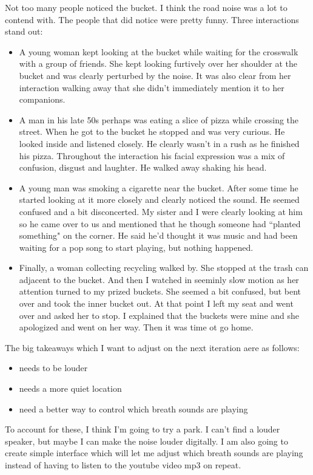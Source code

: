 \documentclass[11pt]{report}
\begin{document}
Not too many people noticed the bucket. I think the road noise was a lot to contend with. The people that did notice were pretty funny. Three interactions stand out:
\begin{itemize}
\item
A young woman kept looking at the bucket while waiting for the crosswalk with a group of friends. She kept looking furtively over her shoulder at the bucket and was clearly perturbed by the noise. It was also clear from her interaction walking away that she didn't immediately mention it to her companions. 
\item
A man in his late 50s perhaps was eating a slice of pizza while crossing the street. When he got to the bucket he stopped and was very curious. He looked inside and listened closely. He clearly wasn't in a rush as he finished his pizza. Throughout the interaction his facial expression was a mix of confusion, disgust and laughter. He walked away shaking his head. 
\item
A young man was smoking a cigarette near the bucket. After some time he started looking at it more closely and clearly noticed the sound. He seemed confused and a bit disconcerted. My sister and I were clearly looking at him so he came over to us and mentioned that he though someone had ``planted something" on the corner. He said he'd thought it was music and had been waiting for a pop song to start playing, but nothing happened. 
\item
Finally, a woman collecting recycling walked by. She stopped at the trash can adjacent to the bucket. And then I watched in seeminly slow motion as her attention turned to my prized buckets. She seemed a bit confused, but bent over and took the inner bucket out. At that point I left my seat and went over and asked her to stop. I explained that the buckets were mine and she apologized and went on her way. Then it was time ot go home.
\end{itemize}

The big takeaways which I want to adjust on the next iteration aere as follows:
\begin{itemize}
\item
needs to be louder
\item
needs a more quiet location
\item
need a better way to control which breath sounds are playing
\end{itemize}

To account for these, I think I'm going to try a park. I can't find a louder speaker, but maybe I can make the noise louder digitally. I am also going to create simple interface which will let me adjust which breath sounds are playing instead of having to listen to the youtube video mp3 on repeat.
\clearpage
\end{document}
